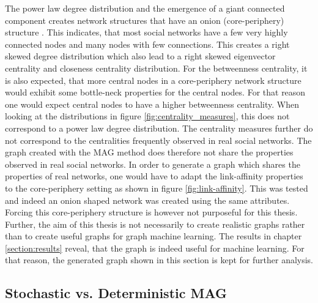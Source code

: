   \noindent The power law degree distribution and the emergence of a giant
  connected component creates network structures that have an onion
  (core-periphery) structure \citep[p. 121]{kim2012multiplicative}. This
  indicates, that most social networks have a few very highly connected nodes
  and many nodes with few connections. This creates a right skewed degree 
  distribution which also lead to a right skewed eigenvector centrality and
  closeness centrality distribution. For the betweenness centrality, it is 
  also expected, that more central nodes in a core-periphery network structure
  would exhibit some bottle-neck properties for the central nodes. For that
  reason one would expect central nodes to have a higher betweenness centrality.
  When looking at the distributions in figure \ref{fig:centrality_measures},
  this does not correspond to a power law degree distribution. The centrality 
  measures further do not correspond to the centralities frequently observed in 
  real social networks. The graph created with the MAG method does therefore 
  not share the properties observed in real social networks. In order to 
  generate a graph which shares the properties of real networks, one would have 
  to adapt the link-affinity properties to the core-periphery setting as shown 
  in figure \ref{fig:link-affinity}. This was tested and indeed an onion shaped
  network was created using the same attributes. Forcing this core-periphery 
  structure is however not purposeful for this thesis. Further, the aim of this 
  thesis is not necessarily to create realistic graphs rather than to create 
  useful graphs for graph machine learning. The results in chapter 
  \ref{section:results} reveal, that the graph is indeed useful for machine 
  learning. For that reason, the generated graph shown in this section is kept 
  for further analysis. 

  \subsection{Stochastic vs. Deterministic MAG}
  \label{section:stoch_det}

